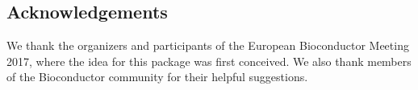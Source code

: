 \documentclass[10pt,a4paper,twocolumn]{article}
\begin{document}
\subsection*{Acknowledgements}
We thank the organizers and participants of the European Bioconductor Meeting 2017, where the idea for this package was first conceived.
We also thank members of the Bioconductor community for their helpful suggestions.



{\small
}

\bigskip





\end{document}
